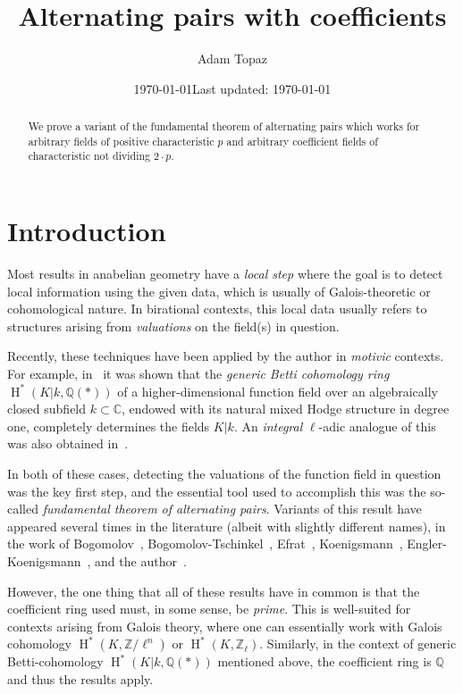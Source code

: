 \documentclass[12pt]{amsart}
\title{Alternating pairs with coefficients}
\author{Adam Topaz}
\date{\today}
\date{Last updated: \today}
\newcommand{\HH}{\operatorname{H}}
\newcommand{\Qbb}{\mathbb{Q}}
\newcommand{\Cbb}{\mathbb{C}}
\newcommand{\Zbb}{\mathbb{Z}}
\begin{document}
\maketitle

\begin{abstract}
  We prove a variant of the fundamental theorem of alternating pairs which works for arbitrary fields of positive characteristic $p$ and arbitrary coefficient fields of characteristic not dividing $2 \cdot p$.
\end{abstract}

\tableofcontents

\section{Introduction}

Most results in anabelian geometry have a \emph{local step} where the goal is to detect local information using the given data, which is usually of Galois-theoretic or cohomological nature.
In birational contexts, this local data usually refers to structures arising from \emph{valuations} on the field(s) in question.

Recently, these techniques have been applied by the author in \emph{motivic} contexts.
For example, in~\cite{https://doi.org/10.48550/arxiv.1705.01084} it was shown that the \emph{generic Betti cohomology ring} $\HH^{*}(K|k,\Qbb(*))$ of a higher-dimensional function field over an algebraically closed subfield $k \subset \Cbb$, endowed with its natural mixed Hodge structure in degree one, completely determines the fields $K|k$.
An \emph{integral} $\ell$-adic analogue of this was also obtained in~\cite{https://doi.org/10.48550/arxiv.1910.03563}.

In both of these cases, detecting the valuations of the function field in question was the key first step, and the essential tool used to accomplish this was the so-called \emph{fundamental theorem of alternating pairs}.
Variants of this result have appeared several times in the literature (albeit with slightly different names), in the work of Bogomolov~\cite{zbMATH00124400}, Bogomolov-Tschinkel~\cite{zbMATH02078165}, Efrat~\cite{zbMATH01489500}, Koenigsmann~\cite{zbMATH00785379}, Engler-Koenigsmann~\cite{zbMATH01135369}, and the author~\cite{zbMATH06778776,https://doi.org/10.48550/arxiv.1705.01084}.

However, the one thing that all of these results have in common is that the coefficient ring used must, in some sense, be \emph{prime}.
This is well-suited for contexts arising from Galois theory, where one can essentially work with Galois cohomology $\HH^{*}(K,\Zbb/\ell^{n})$ or $\HH^{*}(K,\Zbb_{\ell})$.
Similarly, in the context of generic Betti-cohomology $\HH^{*}(K|k,\Qbb(*))$ mentioned above, the coefficient ring is $\Qbb$ and thus the results apply.
\end{document}
